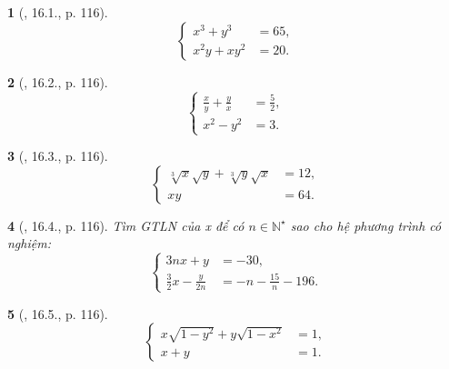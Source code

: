 \documentclass{article}
\newtheorem{baitoan}{}
\begin{document}
\begin{baitoan}[\cite{TLCT_THCS_Toan_9_dai_so}, 16.1., p. 116]
	\begin{equation*}
		\left\{\begin{split}
			x^3 + y^3 &= 65,\\
			x^2y + xy^2 &= 20.
		\end{split}\right.
	\end{equation*}
\end{baitoan}

\begin{baitoan}[\cite{TLCT_THCS_Toan_9_dai_so}, 16.2., p. 116]
	\begin{equation*}
		\left\{\begin{split}
			\frac{x}{y} + \frac{y}{x} &= \frac{5}{2},\\
			x^2 - y^2 &= 3.
		\end{split}\right.
	\end{equation*}
\end{baitoan}

\begin{baitoan}[\cite{TLCT_THCS_Toan_9_dai_so}, 16.3., p. 116]
	\begin{equation*}
		\left\{\begin{split}
			\sqrt[3]{x}\sqrt{y} + \sqrt[3]{y}\sqrt{x} &= 12,\\
			xy &= 64.
		\end{split}\right.
	\end{equation*}
\end{baitoan}

\begin{baitoan}[\cite{TLCT_THCS_Toan_9_dai_so}, 16.4., p. 116]
	Tìm {\rm GTLN} của x để có $n\in\mathbb{N}^\star$ sao cho hệ phương trình có nghiệm:
	\begin{equation*}
		\left\{\begin{split}
			3nx + y &= -30,\\
			\frac{3}{2}x - \frac{y}{2n} &= -n - \frac{15}{n} - 196.
		\end{split}\right.
	\end{equation*}
\end{baitoan}

\begin{baitoan}[\cite{TLCT_THCS_Toan_9_dai_so}, 16.5., p. 116]
	\begin{equation*}
		\left\{\begin{split}
			x\sqrt{1 - y^2} + y\sqrt{1 - x^2} &= 1,\\
			x + y &= 1.
		\end{split}\right.
	\end{equation*}
\end{baitoan}
\end{document}
